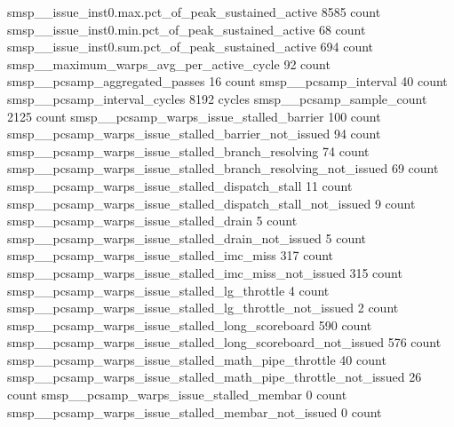 smsp__issue_inst0.max.pct_of_peak_sustained_active                                          8585 count
smsp__issue_inst0.min.pct_of_peak_sustained_active                                            68 count
smsp__issue_inst0.sum.pct_of_peak_sustained_active                                           694 count
smsp__maximum_warps_avg_per_active_cycle                                                      92 count
smsp__pcsamp_aggregated_passes                                                                16 count
smsp__pcsamp_interval                                                                         40 count
smsp__pcsamp_interval_cycles                                                                8192 cycles
smsp__pcsamp_sample_count                                                                   2125 count
smsp__pcsamp_warps_issue_stalled_barrier                                                     100 count
smsp__pcsamp_warps_issue_stalled_barrier_not_issued                                           94 count
smsp__pcsamp_warps_issue_stalled_branch_resolving                                             74 count
smsp__pcsamp_warps_issue_stalled_branch_resolving_not_issued                                  69 count
smsp__pcsamp_warps_issue_stalled_dispatch_stall                                               11 count
smsp__pcsamp_warps_issue_stalled_dispatch_stall_not_issued                                     9 count
smsp__pcsamp_warps_issue_stalled_drain                                                         5 count
smsp__pcsamp_warps_issue_stalled_drain_not_issued                                              5 count
smsp__pcsamp_warps_issue_stalled_imc_miss                                                    317 count
smsp__pcsamp_warps_issue_stalled_imc_miss_not_issued                                         315 count
smsp__pcsamp_warps_issue_stalled_lg_throttle                                                   4 count
smsp__pcsamp_warps_issue_stalled_lg_throttle_not_issued                                        2 count
smsp__pcsamp_warps_issue_stalled_long_scoreboard                                             590 count
smsp__pcsamp_warps_issue_stalled_long_scoreboard_not_issued                                  576 count
smsp__pcsamp_warps_issue_stalled_math_pipe_throttle                                           40 count
smsp__pcsamp_warps_issue_stalled_math_pipe_throttle_not_issued                                26 count
smsp__pcsamp_warps_issue_stalled_membar                                                        0 count
smsp__pcsamp_warps_issue_stalled_membar_not_issued                                             0 count
